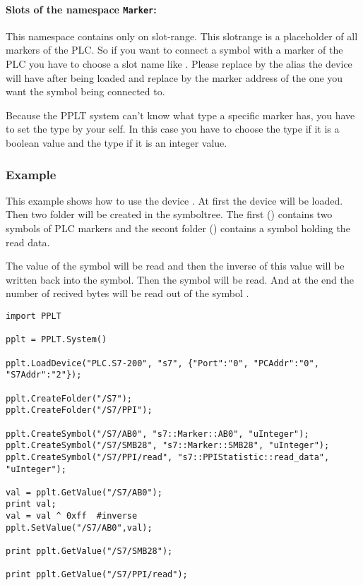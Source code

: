 \paragraph{Slots of the namespace \texttt{Marker}:}
This namespace contains only on slot-range. This slotrange is a placeholder of
all markers of the PLC. So if you want to connect a symbol with a marker of 
the PLC you have to choose a slot name like 
. Please replace  by the alias 
the device will have after being loaded and replace  by the 
marker address of the one you want the symbol being connected to.

Because the PPLT system can't know what type a specific marker has, you have 
to set the type by your self. In this case you have to choose the type 
 if it is a boolean value and the type  if it is an 
integer value.


\subsubsection{Example}
This example shows how to use the device . At first the 
device will be loaded. Then two folder will be created in the symboltree. The 
first () contains two symbols of PLC markers and the secont folder
() contains a symbol holding the read data.

The value of the symbol  will be read and then the inverse of 
this value will be written back into the symbol. Then the symbol 
 will be read. And at the end the number of recived bytes 
will be read out of the symbol .
\begin{verbatim}
import PPLT

pplt = PPLT.System()

pplt.LoadDevice("PLC.S7-200", "s7", {"Port":"0", "PCAddr":"0", "S7Addr":"2"});

pplt.CreateFolder("/S7");
pplt.CreateFolder("/S7/PPI");

pplt.CreateSymbol("/S7/AB0", "s7::Marker::AB0", "uInteger");
pplt.CreateSymbol("/S7/SMB28", "s7::Marker::SMB28", "uInteger");
pplt.CreateSymbol("/S7/PPI/read", "s7::PPIStatistic::read_data", "uInteger");

val = pplt.GetValue("/S7/AB0");
print val;
val = val ^ 0xff  #inverse
pplt.SetValue("/S7/AB0",val);

print pplt.GetValue("/S7/SMB28");

print pplt.GetValue("/S7/PPI/read");
\end{verbatim}




